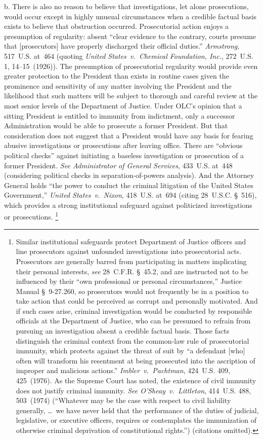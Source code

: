 b. There is also no reason to believe that investigations, let alone prosecutions, would occur except in highly unusual circumstances when a credible factual basis exists to believe that obstruction occurred.
Prosecutorial action enjoys a presumption of regularity: absent ``clear evidence to the contrary, courts presume that [prosecutors] have properly discharged their official duties.''
\textit{Armstrong}, 517~U.S. at~464 (quoting \textit{United States~v.\ Chemical Foundation, Inc.}, 272~U.S. 1, 14--15~(1926)).
The presumption of prosecutorial regularity would provide even greater protection to the President than exists in routine cases given the prominence and sensitivity of any matter involving the President and the likelihood that such matters will be subject to thorough and careful review at the most senior levels of the Department of Justice.
Under OLC's opinion that a sitting President is entitled to immunity from indictment, only a successor Administration would be able to prosecute a former President.
But that consideration does not suggest that a President would have any basis for fearing abusive investigations or prosecutions after leaving office.
There are ``obvious political checks'' against initiating a baseless investigation or prosecution of a former President.
\textit{See Administrator of General Services}, 433~U.S. at~448 (considering political checks in separation-of-powers analysis).
And the Attorney General holds ``the power to conduct the criminal litigation of the United States Government,'' \textit{United States~v.\ Nixon}, 418~U.S. at~694 (citing 28~U.S.C. \S~516), which provides a strong institutional safeguard against politicized investigations or prosecutions.%
\footnote{Similar institutional safeguards protect Department of Justice officers and line prosecutors against unfounded investigations into prosecutorial acts.
Prosecutors are generally barred from participating in matters implicating their personal interests, \textit{see} 28~C.F.R. \S~45.2, and are instructed not to be influenced by their ``own professional or personal circumstances,'' Justice Manual \S~9-27.260, so prosecutors would not frequently be in a position to take action that could be perceived as corrupt and personally motivated.
And if such cases arise, criminal investigation would be conducted by responsible officials at the Department of Justice, who can be presumed to refrain from pursuing an investigation absent a credible factual basis.
Those facts distinguish the criminal context from the common-law rule of prosecutorial immunity, which protects against the threat of suit by ``a defendant [who] often will transform his resentment at being prosecuted into the ascription of improper and malicious actions.''
\textit{Imbler~v.\ Pachtman}, 424~U.S. 409, 425~(1976).
As the Supreme Court has noted, the existence of civil immunity does not justify criminal immunity.
\textit{See O'Sheay~v.\ Littleton}, 414~U.S. 488, 503~(1974) (``Whatever may be the case with respect to civil liability generally, \dots\ we have never held that the performance of the duties of judicial, legislative, or executive officers, requires or contemplates the immunization of otherwise criminal deprivation of constitutional rights.'') (citations omitted).}

